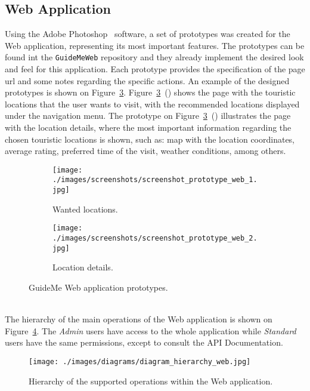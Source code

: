 \subsection{Web Application}
\label{subsec:WebAppPrototype}
Using the Adobe Photoshop~\cite{photoshop} software, a set of prototypes was created for the Web application, representing its most important features. The prototypes can be found int the \verb"GuideMeWeb" repository and they already implement the desired look and feel for this application. Each prototype provides the specification of the page \gls{url} and some notes regarding the specific actions. An example of the designed prototypes is shown on Figure~\ref{fig:guideMeWebScreenshots}. Figure~\ref{fig:guideMeWebScreenshots}~() shows the page with the touristic locations that the user wants to visit, with the recommended locations displayed under the navigation menu. The prototype on Figure~\ref{fig:guideMeWebScreenshots}~() illustrates the page with the location details, where the most important information regarding the chosen touristic locations is shown, such as: map with the location coordinates, average rating, preferred time of the visit, weather conditions, among others.\\
\begin{figure}
        \begin{subfigure}[b]{0.5\textwidth}
                \texttt{[image: ./images/screenshots/screenshot\_prototype\_web\_1.jpg]}
                \caption{Wanted locations.}
                \label{fig:guidemeWebScreenshots1}
        \end{subfigure}%
        \begin{subfigure}[b]{0.5\textwidth}
                \texttt{[image: ./images/screenshots/screenshot\_prototype\_web\_2.jpg]}
                \caption{Location details.}
                \label{fig:guidemeWebScreenshots2}
        \end{subfigure}
        \caption{GuideMe Web application prototypes.}
        \label{fig:guideMeWebScreenshots}
\end{figure}
\\
The hierarchy of the main operations of the Web application is shown on Figure~\ref{fig:webSiteHierarchy}. The \emph{Admin} users have access to the whole application while \emph{Standard} users have the same permissions, except to consult the API Documentation.
\begin{figure}[h!]
 \centering
   \texttt{[image: ./images/diagrams/diagram\_hierarchy\_web.jpg]}   
   \caption{Hierarchy of the supported operations within the Web application.}
   \label{fig:webSiteHierarchy}
\end{figure}
